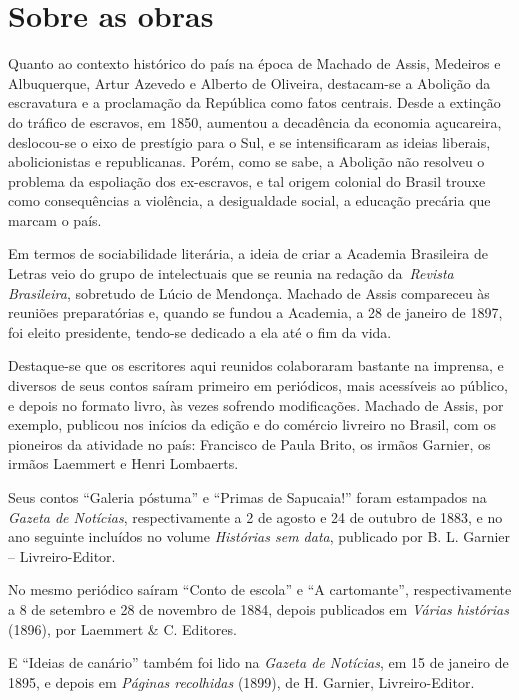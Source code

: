 \chapter{Sobre as obras} %

Quanto ao contexto histórico do país na época de Machado de Assis,
Medeiros e Albuquerque, Artur Azevedo e Alberto de Oliveira, destacam-se
a Abolição da escravatura e a proclamação da República como fatos
centrais. Desde a extinção do tráfico de escravos, em 1850, aumentou a
decadência da economia açucareira, deslocou-se o eixo de prestígio para
o Sul, e se intensificaram as ideias liberais, abolicionistas e
republicanas. Porém, como se sabe, a Abolição não resolveu o problema da
espoliação dos ex-escravos, e tal origem colonial do Brasil trouxe como
consequências a violência, a desigualdade social, a educação precária
que marcam o país.

Em termos de sociabilidade literária, a ideia de criar a Academia
Brasileira de Letras veio do grupo de intelectuais que se reunia na
redação da~\emph{Revista Brasileira}, sobretudo de Lúcio de Mendonça.
Machado de Assis compareceu às reuniões preparatórias e, quando se
fundou a Academia, a 28 de janeiro de 1897, foi eleito presidente,
tendo-se dedicado a ela até o fim da vida.

Destaque-se que os escritores aqui reunidos colaboraram bastante na
imprensa, e diversos de seus contos saíram primeiro em periódicos, mais
acessíveis ao público, e depois no formato livro, às vezes sofrendo
modificações. Machado de Assis, por exemplo, publicou nos inícios da
edição e do comércio livreiro no Brasil, com os pioneiros da atividade
no país: Francisco de Paula Brito, os irmãos Garnier, os irmãos Laemmert
e Henri Lombaerts.

Seus contos ``Galeria póstuma'' e ``Primas de Sapucaia!'' foram
estampados na \emph{Gazeta de Notícias}, respectivamente a 2 de agosto e
24 de outubro de 1883, e no ano seguinte incluídos no volume
\emph{Histórias sem data}, publicado por B. L. Garnier --
Livreiro-Editor.

No mesmo periódico saíram ``Conto de escola'' e ``A cartomante'',
respectivamente a 8 de setembro e 28 de novembro de 1884, depois
publicados em \emph{Várias histórias} (1896), por Laemmert \& C.
Editores.

E ``Ideias de canário'' também foi lido na \emph{Gazeta de Notícias}, em
15 de janeiro de 1895, e depois em \emph{Páginas recolhidas} (1899), de
H. Garnier, Livreiro-Editor.

